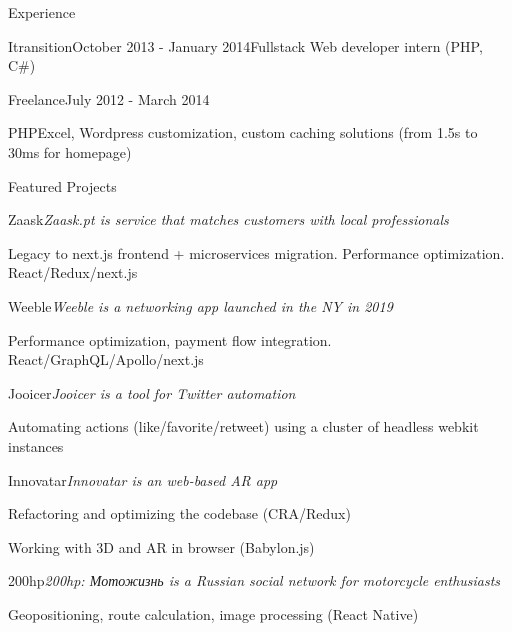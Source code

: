 \documentclass{resume} %
\begin{document}
\begin{rSection}{Experience}
\begin{rSubsection}{Itransition}{October 2013 - January 2014}{Fullstack Web developer intern (PHP, C\#)}{}
\end{rSubsection}

\begin{rSubsection}{Freelance}{July 2012 - March 2014}{}{}
\item PHPExcel, Wordpress customization, custom caching solutions (from 1.5s to 30ms for homepage)
\end{rSubsection}

\end{rSection}

\clearpage

\begin{rSection}{Featured Projects}


\begin{rSubsection}{Zaask}{\it Zaask.pt is service that matches customers with local professionals}{}{}
\item Legacy to next.js frontend + microservices migration. Performance optimization. React/Redux/next.js
\end{rSubsection}

\begin{rSubsection}{Weeble}{\it Weeble is a networking app launched in the NY in 2019}{}{}
\item Performance optimization, payment flow integration. React/GraphQL/Apollo/next.js
\end{rSubsection}

\begin{rSubsection}{Jooicer}{\it Jooicer is a tool for Twitter automation}{}{}
\item Automating actions (like/favorite/retweet) using a cluster of headless webkit instances
\end{rSubsection}

\begin{rSubsection}{Innovatar}{\it Innovatar is an web-based AR app}{}{}
\item Refactoring and optimizing the codebase (CRA/Redux)
\item Working with 3D and AR in browser (Babylon.js)
\end{rSubsection}

\begin{rSubsection}{200hp}{\it 200hp: \foreignlanguage{russian}{Мотожизнь} is a Russian social network for motorcycle enthusiasts}{}{}
\item Geopositioning, route calculation, image processing (React Native)
\end{rSubsection}

\end{rSection}
\end{document}
